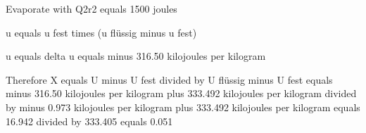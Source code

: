Evaporate with Q2r2 equals 1500 joules

u equals u fest times (u flüssig minus u fest)

u equals delta u equals minus 316.50 kilojoules per kilogram

Therefore X equals U minus U fest divided by U flüssig minus U fest equals minus 316.50 kilojoules per kilogram plus 333.492 kilojoules per kilogram divided by minus 0.973 kilojoules per kilogram plus 333.492 kilojoules per kilogram equals 16.942 divided by 333.405 equals 0.051